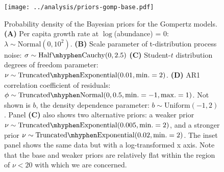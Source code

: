 \documentclass[12pt]{article}
\begin{document}
\begin{figure}[htbp]
\begin{center}
\texttt{[image: ../analysis/priors-gomp-base.pdf]}

\caption{Probability density of the Bayesian priors for the Gompertz models. \textbf{(A)} Per capita growth rate at $\log$(abundance) = $0$: $\lambda \sim \mathrm{Normal}(0, 10^2)$. \textbf{(B)} Scale parameter of t-distribution process noise: $\sigma \sim \mathrm{Half\mhyphen Cauchy} (0, 2.5)$ \textbf{(C)} Student-$t$ distribution degrees of freedom parameter: $\nu \sim \mathrm{Truncated\mhyphen Exponential}(0.01, \mathrm{min.} = 2)$. \textbf{(D)} AR1 correlation coefficient of residuals: $\phi \sim \mathrm{Truncated \mhyphen Normal}(0, 0.5, \mathrm{min.} = -1, \mathrm{max.} = 1)$. Not shown is $b$, the density dependence parameter: $b \sim \mathrm{Uniform}(-1, 2)$. Panel \textbf{(C)} also shows two alternative priors: a weaker prior $\nu \sim \mathrm{Truncated\mhyphen Exponential}(0.005, \mathrm{min.} = 2)$, and a stronger prior $\nu \sim \mathrm{Truncated\mhyphen Exponential}(0.02, \mathrm{min.} = 2)$. The inset panel shows the same data but with a log-transformed x axis. Note that the base and weaker priors are relatively flat within the region of $\nu < 20$ with which we are concerned.}

\label{fig:priors}
\end{center}
\end{figure}





%




%
%
%
\end{document}
